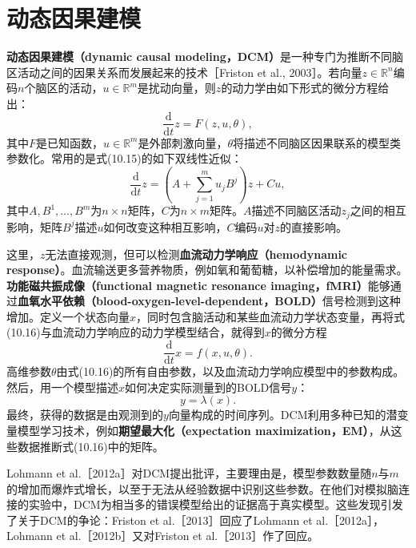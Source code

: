 \section{动态因果建模}
\textbf{动态因果建模（dynamic causal modeling，DCM）}是一种专门为推断不同脑区活动之间的因果关系而发展起来的技术［Friston et al., 2003］。若向量$z\in\mathbb R^n$编码$n$个脑区的活动，$u\in\mathbb R^m$是扰动向量，则$z$的动力学由如下形式的微分方程给出：
\begin{equation}
 \frac{\mathrm d}{\mathrm dt}z=F(z,u,\theta),
 \tag{10.15}
\end{equation}
其中$F$是已知函数，$u\in\mathbb R^m$是外部刺激向量，$\theta$将描述不同脑区因果联系的模型类参数化。常用的是式(10.15)的如下双线性近似：
\begin{equation}
 \frac{\mathrm d}{\mathrm dt}z
 =\left(A+\sum_{j=1}^m u_jB^j\right)z+Cu,
 \tag{10.16}
\end{equation}
其中$A,B^1,\ldots,B^m$为$n\times n$矩阵，$C$为$n\times m$矩阵。$A$描述不同脑区活动$z_j$之间的相互影响，矩阵$B^j$描述$u$如何改变这种相互影响，$C$编码$u$对$z$的直接影响。

这里，$z$无法直接观测，但可以检测\textbf{血流动力学响应（hemodynamic response）}。血流输送更多营养物质，例如氧和葡萄糖，以补偿增加的能量需求。\textbf{功能磁共振成像（functional magnetic resonance imaging，fMRI）}能够通过\textbf{血氧水平依赖（blood-oxygen-level-dependent，BOLD）}信号检测到这种增加。定义一个状态向量$x$，同时包含脑活动和某些血流动力学状态变量，再将式(10.16)与血流动力学响应的动力学模型结合，就得到$x$的微分方程
\begin{equation}
 \frac{\mathrm d}{\mathrm dt}x=f(x,u,\theta).
 \tag{10.17}
\end{equation}
高维参数$\theta$由式(10.16)的所有自由参数，以及血流动力学响应模型中的参数构成。然后，用一个模型描述$x$如何决定实际测量到的BOLD信号$y$：
\begin{equation}
 y=\lambda(x).
 \tag{10.18}
\end{equation}
最终，获得的数据是由观测到的$y$向量构成的时间序列。DCM利用多种已知的潜变量模型学习技术，例如\textbf{期望最大化（expectation maximization，EM）}，从这些数据推断式(10.16)中的矩阵。

Lohmann et al.［2012a］对DCM提出批评，主要理由是，模型参数数量随$n$与$m$的增加而爆炸式增长，以至于无法从经验数据中识别这些参数。在他们对模拟脑连接的实验中，DCM为相当多的错误模型给出的证据高于真实模型。这些发现引发了关于DCM的争论：Friston et al.［2013］回应了Lohmann et al.［2012a］，Lohmann et al.［2012b］又对Friston et al.［2013］作了回应。

